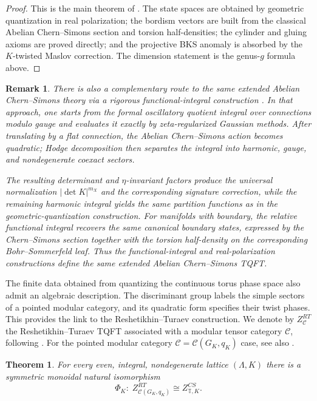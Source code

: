 \documentclass[12pt]{amsart}
\numberwithin{equation}{section}
\newtheorem{theorem}{Theorem}[section]
\newtheorem*{remark}{Remark}
\theoremstyle{definition}
\begin{document}
\begin{proof}
This is the main theorem of \cite{Galviz2}.  The state spaces are obtained by geometric quantization in real polarization; the bordism vectors are built from the classical Abelian Chern--Simons section and torsion half-densities; the cylinder and gluing axioms are proved directly; and the projective BKS anomaly is absorbed by the $K$-twisted Maslov correction.  The dimension statement is the genus-$g$ formula above.
\end{proof}

\begin{remark}
There is also a complementary route to the same extended Abelian Chern--Simons theory via a rigorous functional-integral construction \cite{Galviz2.5}.  In that approach, one starts from the formal oscillatory quotient integral over connections modulo gauge and evaluates it exactly by zeta-regularized Gaussian methods.  After translating by a flat connection, the Abelian Chern--Simons action becomes quadratic; Hodge decomposition then separates the integral into harmonic, gauge, and nondegenerate coexact sectors.
 
The resulting determinant and $\eta$-invariant factors produce the universal normalization $|\det K|^{m_X}$ and the corresponding signature correction, while the remaining harmonic integral yields the same partition functions as in the geometric-quantization construction.  For manifolds with boundary, the relative functional integral recovers the same canonical boundary states, expressed by the Chern--Simons section together with the torsion half-density on the corresponding Bohr--Sommerfeld leaf.  Thus the functional-integral and real-polarization constructions define the same extended Abelian Chern--Simons TQFT.
\end{remark}

The finite data obtained from quantizing the continuous torus phase space also admit an algebraic description. The discriminant group labels the simple sectors of a pointed modular category, and its quadratic form specifies their twist phases. This provides the link to the Reshetikhin--Turaev construction. We denote by $Z^{RT}_{\mathcal C}$ the Reshetikhin--Turaev TQFT associated with a modular tensor category $\mathcal C$, following \cite{Reshetikhin:1991}. For the pointed modular category $\mathcal  C=\mathcal C(G_K,q_K)$ case, see also \cite{Galviz3}.

\begin{theorem}\cite[Theorem 4.15]{Galviz3} \label{thm:cs-rt-equivalence} For every even, integral, nondegenerate lattice $(\Lambda,K)$ there is a symmetric monoidal natural isomorphism
$$
\Phi_K:\; Z^{RT}_{\mathcal C(G_K,q_K)}\cong Z^{CS}_{\mathbb T,K}.
$$
\end{theorem}
\end{document}
